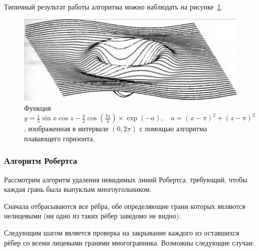 Типичный результат работы алгоритма можно наблюдать на рисунке~\ref{fig:floating_horizon_7}.~\cite{rodgers}

\begin{figure}[H]
    \centering
    \includegraphics[width=\textwidth]{img/floating_horizon_7.png}
    \caption{Функция \( y = \frac{1}{5} \sin x \cos z - \frac{3}{2} \cos \left( \frac{7a}{4} \right) \times \exp(-a), \quad a = (x - \pi)^2 + (z - \pi)^2 \), изображенная в интервале \( (0, 2\pi) \) с помощью алгоритма плавающего горизонта.}
    \label{fig:floating_horizon_7}
\end{figure}



\subsubsection{Алгоритм Робертса}

\hspace{1.25cm}
Рассмотрим алгоритм удаления невидимых линий Робертса, требующий, чтобы каждая грань была выпуклым многоугольником.

Сначала отбрасываются все рёбра, обе определяющие грани которых являются нелицевыми (ни одно из таких рёбер заведомо не видно).

Следующим шагом является проверка на закрывание каждого из оставшихся рёбер со всеми лицевыми гранями многогранника. Возможны следующие случаи:

